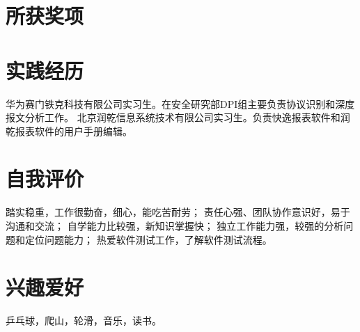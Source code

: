 \documentclass[a4paper]{moderncv}
\begin{document}
\begin{CJK*}{UTF8}{gbsn}
\section{所获奖项}
\section{实践经历}
{华为赛门铁克科技有限公司实习生。在安全研究部DPI组主要负责协议识别和深度报文分析工作。}
{ 北京润乾信息系统技术有限公司实习生。负责快逸报表软件和润乾报表软件的用户手册编辑。 }

\section{自我评价}
\cvitem{}{}
{
踏实稳重，工作很勤奋，细心，能吃苦耐劳；
责任心强、团队协作意识好，易于沟通和交流；
自学能力比较强，新知识掌握快；
独立工作能力强，较强的分析问题和定位问题能力；
热爱软件测试工作，了解软件测试流程。
}

\section{兴趣爱好}
\cvitem{}
{
乒乓球，爬山，轮滑，音乐，读书。
}
\closesection
\end{CJK*}
\end{document}
